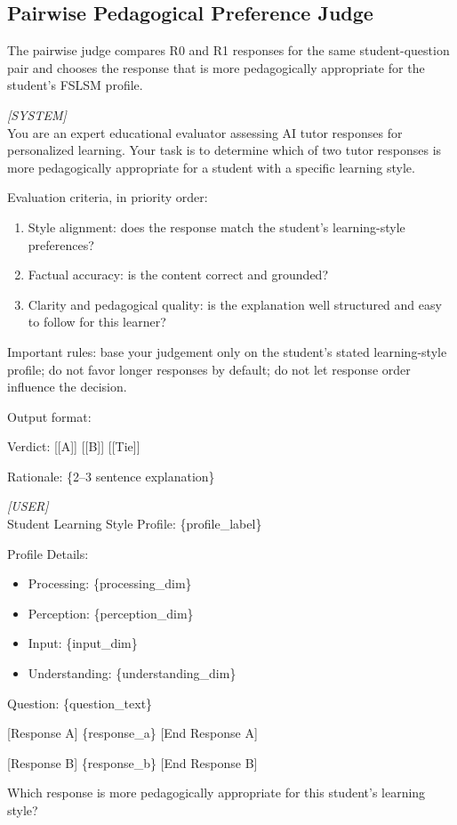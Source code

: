 \subsection{Pairwise Pedagogical Preference Judge}
The pairwise judge compares R0 and R1 responses for the same student-question pair and chooses the response that is more pedagogically appropriate for the student's FSLSM profile.
\begin{shadedquotation}
    \textit{[SYSTEM]} \\
    You are an expert educational evaluator assessing AI tutor responses for personalized learning. Your task is to determine which of two tutor responses is more pedagogically appropriate for a student with a specific learning style.

    Evaluation criteria, in priority order:
    \begin{enumerate}
        \item Style alignment: does the response match the student's learning-style preferences?
        \item Factual accuracy: is the content correct and grounded?
        \item Clarity and pedagogical quality: is the explanation well structured and easy to follow for this learner?
    \end{enumerate}

    Important rules: base your judgement only on the student's stated learning-style profile; do not favor longer responses by default; do not let response order influence the decision.

    Output format:

    Verdict: [[A]] \textbar{} [[B]] \textbar{} [[Tie]]

    Rationale: \{2--3 sentence explanation\}

    \vspace{0.5em}
    \textit{[USER]} \\
    Student Learning Style Profile: \{profile\_label\}

    Profile Details:
    \begin{itemize}
        \item Processing: \{processing\_dim\}
        \item Perception: \{perception\_dim\}
        \item Input: \{input\_dim\}
        \item Understanding: \{understanding\_dim\}
    \end{itemize}

    Question: \{question\_text\}

    [Response A] \{response\_a\} [End Response A]

    [Response B] \{response\_b\} [End Response B]

    Which response is more pedagogically appropriate for this student's learning style?
\end{shadedquotation}

